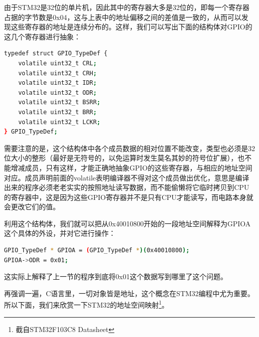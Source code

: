 \par 
由于STM32是32位的单片机，因此其中的寄存器大多是32位的，即每一个寄存器占据的字节数是0x04，这与上表中的地址偏移之间的差值是一致的，从而可以发现这些寄存器的地址是连续分布的。这样，我们可以写出下面的结构体对GPIO的这几个寄存器进行抽象：
\par 
\begin{lstlisting}[language=bash, style=customStyleC, caption=GPIO结构体, label=periphStruct]
typedef struct GPIO_TypeDef {
	volatile uint32_t CRL;
	volatile uint32_t CRH;
	volatile uint32_t IDR;
	volatile uint32_t ODR;
	volatile uint32_t BSRR;
	volatile uint32_t BRR;
	volatile uint32_t LCKR;
} GPIO_TypeDef;
\end{lstlisting}
\par 
需要注意的是，这个结构体中各个成员数据的相对位置不能改变，类型也必须是32位大小的整形（最好是无符号的，以免运算时发生莫名其妙的符号位扩展），也不能增减成员，只有这样，才能正确地抽象GPIO的这些寄存器，与相应的地址空间对应。成员声明前面的volatile表明编译器不得对这个成员做出优化，意思是编译出来的程序必须老老实实的按照地址读写数据，而不能偷懒将它临时拷贝到CPU的寄存器中，这是因为这些GPIO寄存器并不是只有CPU才能读写，而电路本身就会更改它们的值。
\par 
利用这个结构体，我们就可以把从0x40010800开始的一段地址空间解释为GPIOA这个具体的外设，并对它进行操作：
\par 
\begin{lstlisting}[language=bash, style=customStyleC, caption=GPIO结构体应用]
GPIO_TypeDef * GPIOA = (GPIO_TypeDef *)(0x40010800);
GPIOA->ODR = 0x01;
\end{lstlisting}
\par 
这实际上解释了上一节的程序到底将0x01这个数据写到哪里了这个问题。
\par 
再强调一遍，C语言里，一切对象皆是地址，这个概念在STM32编程中尤为重要。所以下面，我们来欣赏一下STM32的地址空间映射\footnote{截自STM32F103C8 Datasheet}。
\par 
